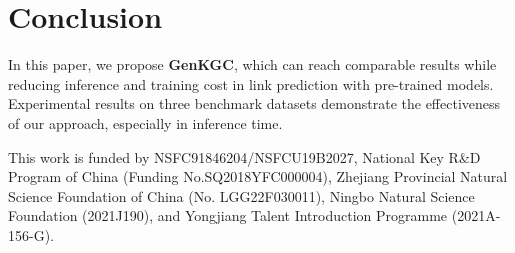 \documentclass[sigconf]{acmart}
\newcommand{\ours}{\textbf{GenKGC}}
\begin{document}
\section{Conclusion}

In this paper, we propose \ours, which can reach comparable results while reducing inference and training cost in link prediction with pre-trained models.
Experimental results on three benchmark datasets demonstrate the effectiveness of our approach, especially in inference time. 



\begin{acks}
This work is funded by NSFC91846204/NSFCU19B2027, National Key R\&D Program of China (Funding No.SQ2018YFC000004), Zhejiang Provincial Natural Science Foundation of China  (No. LGG22F030011), Ningbo Natural Science Foundation (2021J190), and Yongjiang Talent Introduction Programme (2021A-156-G). 
\end{acks}




\appendix
\end{document}
